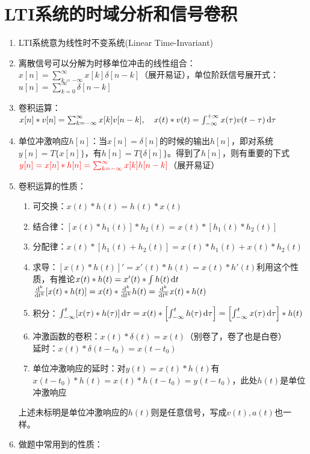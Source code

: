 \documentclass{article}
\begin{document}
\section{LTI系统的时域分析和信号卷积}
\begin{enumerate}[label=(\arabic*)]
	\item LTI系统意为线性时不变系统(Linear Time-Invariant)
	\item 离散信号可以分解为时移单位冲击的线性组合：$x[n]=\sum_{k=-\infty}^{\infty}x[k]\delta[n-k]$（展开易证），单位阶跃信号展开式：$u[n]=\sum_{k=0}^{\infty}\delta[n-k]$
	\item 卷积运算：$x[n]*v[n]=\sum_{k=-\infty}^{\infty}x[k]v[n-k],\quad x(t)*v(t)=\int_{-\infty}^{+\infty}x(\tau)v(t-\tau)\mathop{}\!\mathrm{d} \tau$
	\item 单位冲激响应$h[n]$：当$x[n]=\delta[n]$的时候的输出$h[n]$，即对系统$y[n]=T\{x[n]\}$，有$h[n]=T\{\delta[n]\}$。得到了$h[n]$，则有重要的下式\\
				$\color{red} y[n]=x[n]*h[n]=\sum_{k=-\infty}^{\infty}x[k]h[n-k]$（展开易证）
	\item 卷积运算的性质：
				\begin{enumerate}[label=(\roman*)]
					\item 可交换：$x(t)*h(t)=h(t)*x(t)$
					\item 结合律：$[x(t)*h_1(t)]*h_2(t)=x(t)*[h_1(t)*h_2(t)]$
					\item 分配律：$x(t)*[h_1(t)+h_2(t)]=x(t)*h_1(t)+x(t)*h_2(t)$
					\item 求导：$[x(t)*h(t)]'=x'(t)*h(t)=x(t)*h'(t)$利用这个性质，有推论$x(t)*h(t)=x'(t)*\int h(t)\mathop{}\!\mathrm{d} t$\\
								$\frac{\mathop{}\!\mathrm{d}^k}{\mathop{}\!\mathrm{d} t^k}[x(t)*h(t)]=x(t)*\frac{\mathop{}\!\mathrm{d}^k}{\mathop{}\!\mathrm{d} t^k}h(t)=\frac{\mathop{}\!\mathrm{d}^k}{\mathop{}\!\mathrm{d} t^k}x(t)*h(t)$
					\item 积分：$\int_{-\infty}^{t}[x(\tau)*h(\tau)]\mathop{}\!\mathrm{d}\tau=x(t)*\left[\int_{-\infty}^{t}h(\tau)\mathop{}\!\mathrm{d}\tau\right]=\left[\int_{-\infty}^{t}x(\tau)\mathop{}\!\mathrm{d}\tau\right]*h(t)$
					\item 冲激函数的卷积：$x(t)*\delta(t)=x(t)$（别卷了，卷了也是白卷）\\
								延时：$x(t)*\delta(t-t_0)=x(t-t_0)$
					\item 单位冲激响应的延时：对$y(t)=x(t)*h(t)$有$x(t-t_0)*h(t)=x(t)*h(t-t_0)=y(t-t_0)$，此处$h(t)$是单位冲激响应
				\end{enumerate}
				\begin{remark}
					上述未标明是单位冲激响应的$h(t)$则是任意信号，写成$v(t),a(t)$也一样。
				\end{remark}
	\item 做题中常用到的性质：

\end{enumerate}
\end{document}
